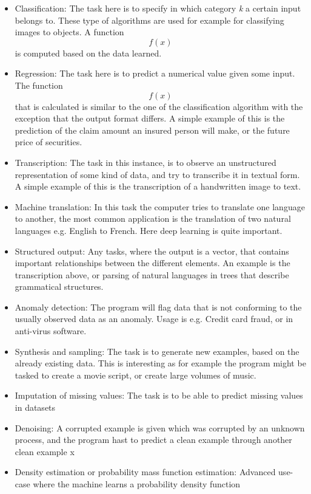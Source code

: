 \documentclass{article}
\begin{document}
\begin{itemize}
    \item Classification: The task here is to specify in which category \textit{k} a certain input belongs to. These type of algorithms are used for example for classifying images to objects. A function \[f(x)\] is computed based on the data learned.
    \item Regression: The task here is to predict a numerical value given some input. The function \[f(x)\] that is calculated is similar to the one of the classification algorithm with the exception that the output format differs. A simple example of this is the prediction of the claim amount an insured person will make, or the future price of securities.
    \item Transcription: The task in this instance, is to observe an unstructured representation of some kind of data, and try to transcribe it in textual form. A simple example of this is the transcription of a handwritten image to text.
    \item Machine translation: In this task the computer tries to translate one language to another, the most common application is the translation of two natural languages e.g. English to French. Here deep learning is quite important.
    \item Structured output: Any tasks, where the output is a vector, that contains important relationships between the different elements. An example is the transcription above, or parsing of natural languages in trees that describe grammatical structures.
    \item Anomaly detection: The program will flag data that is not conforming to the usually observed data as an anomaly. Usage is e.g. Credit card fraud, or in anti-virus software.
    \item Synthesis and sampling: The task is to generate new examples, based on the already existing data. This is interesting as for example the program might be tasked to create a movie script, or create large volumes of music.
    \item Imputation of missing values: The task is to be able to predict missing values in datasets
    \item Denoising: A corrupted example is given which was corrupted by an unknown process, and the program hast to predict a clean example through another clean example x
    \item Density estimation or probability mass function estimation:  Advanced use-case where the machine learns a probability density function
\end{itemize}
\end{document}
